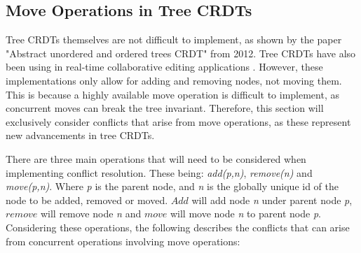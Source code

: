 \documentclass[12pt]{report}
\begin{document}
\subsection{Move Operations in Tree CRDTs}
Tree CRDTs themselves are not difficult to implement, as shown by the paper "Abstract unordered and ordered trees CRDT" \cite{martin2012abstract} from 2012. Tree CRDTs have also been using in real-time collaborative editing applications \cite{5158449}. However, these implementations only allow for adding and removing nodes, not moving them. This is because a highly available move operation is difficult to implement, as concurrent moves can break the tree invariant. Therefore, this section will exclusively consider conflicts that arise from move operations, as these represent new advancements in tree CRDTs. 

There are three main operations that will need to be considered when implementing conflict resolution. These being: \textit{add(p,n)}, \textit{remove(n)} and \textit{move(p,n)}. Where \textit{p} is the parent node, and \textit{n} is the globally unique id of the node to be added, removed or moved. $Add$ will add node \textit{n} under parent node \textit{p}, $remove$ will remove node \textit{n} and $move$ will move node \textit{n} to parent node \textit{p}. Considering these operations, the following describes the conflicts that can arise from concurrent operations involving move operations:

\addtocounter{footnote}{1}
\end{document}
